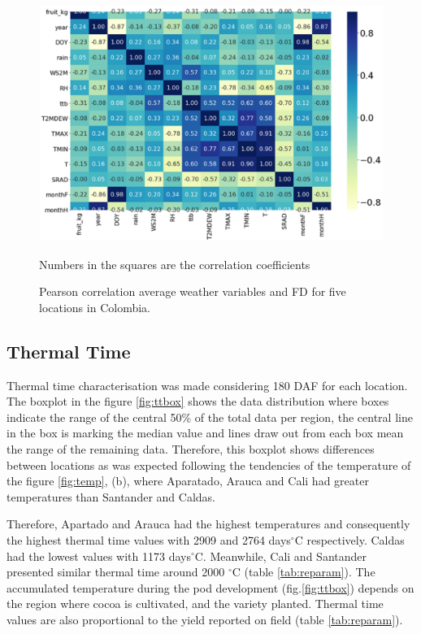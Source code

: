 \documentclass[gene,journal,article,submit,moreauthors,pdftex]{Definitions/mdpi}
\begin{document}
\begin{figure}[h!]
	\centering
	\includegraphics[scale=0.2]{images/heatm.png}\\
	\caption{\footnotesize {Pearson correlation average weather variables and FD for five locations in Colombia. \\}}
	\label{fig:heat} 
	{\footnotesize Numbers in the squares are the correlation coefficients }
\end{figure}
\newpage

\subsection{Thermal Time }

Thermal time characterisation was made considering 180 DAF for each location. The boxplot in the figure \ref{fig:ttbox} shows the data distribution where boxes indicate the range of the central 50\% of the total data per region, the central line in the box is marking the median value and lines draw out from each box mean the range of the remaining data. Therefore, this boxplot shows differences between locations as was expected following the tendencies of the temperature of the figure \ref{fig:temp}, (b), where Aparatado, Arauca and Cali had greater temperatures than Santander and Caldas. 

Therefore, Apartado and Arauca had the highest temperatures and consequently the highest thermal time values with 2909 and 2764 days$^\circ$C  respectively. Caldas had the lowest values with 1173 days$^\circ$C. Meanwhile, Cali and Santander presented similar thermal time around 2000 $^\circ$C (table \ref{tab:reparam}). The accumulated temperature during the pod development (fig.\ref{fig:ttbox}) depends on the region where cocoa is cultivated, and the variety planted. Thermal time values are also proportional to the yield reported on field (table \ref{tab:reparam}). \\
\end{document}
